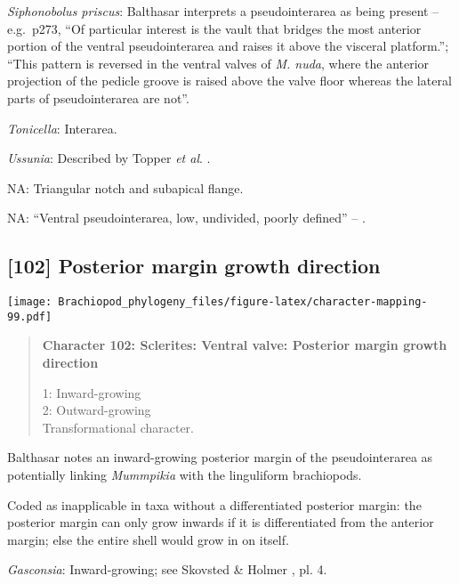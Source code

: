 \documentclass[openany]{book}
\theoremstyle{definition}
\theoremstyle{definition}
\theoremstyle{definition}
\theoremstyle{remark}
\begin{document}
\hypertarget{Siphonobolus_priscus-coding-101}{}
\emph{Siphonobolus priscus}: Balthasar
\citeyearpar{Balthasar2008iMummpikia} interprets a pseudointerarea as
being present -- e.g.~p273, ``Of particular interest is the vault that
bridges the most anterior portion of the ventral pseudointerarea and
raises it above the visceral platform.''; ``This pattern is reversed in
the ventral valves of \emph{M. nuda}, where the anterior projection of
the pedicle groove is raised above the valve floor whereas the lateral
parts of pseudointerarea are not''.

\hypertarget{Tonicella-coding-101}{}
\emph{Tonicella}: Interarea.

\hypertarget{Ussunia-coding-101}{}
\emph{Ussunia}: Described by Topper \emph{et al}.
\citeyearpar{Topper2013Reappraisalof}.

\hypertarget{NA-coding-101}{}
NA: Triangular notch and subapical flange.

\hypertarget{NA-coding-101}{}
NA: ``Ventral pseudointerarea, low, undivided, poorly defined'' --
\citet{Williams2000LinguliformeaCraniiformea}.

\subsection*{{[}102{]} Posterior margin growth
direction}\label{posterior-margin-growth-direction}

\texttt{[image: Brachiopod\_phylogeny\_files/figure-latex/character-mapping-99.pdf]}

\begin{quote}
\textbf{Character 102: Sclerites: Ventral valve: Posterior margin growth
direction}

1: Inward-growing\\
2: Outward-growing\\
Transformational character.
\end{quote}

Balthasar \citeyearpar{Balthasar2008iMummpikia} notes an inward-growing
posterior margin of the pseudointerarea as potentially linking
\emph{Mummpikia} with the linguliform brachiopods.

Coded as inapplicable in taxa without a differentiated posterior margin:
the posterior margin can only grow inwards if it is differentiated from
the anterior margin; else the entire shell would grow in on itself.

\hypertarget{Gasconsia-coding-102}{}
\emph{Gasconsia}: Inward-growing; see Skovsted \& Holmer
\citeyearpar{Skovsted2005EarlyCambrian}, pl. 4.
\end{document}
